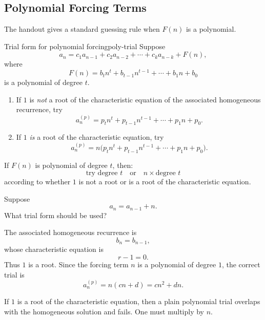 \subsection{Polynomial Forcing Terms}

The handout gives a standard guessing rule when \(F(n)\) is a polynomial.

\begin{theorem}{Trial form for polynomial forcing}{poly-trial}
Suppose
\[
a_n=c_1a_{n-1}+c_2a_{n-2}+\cdots+c_ka_{n-k}+F(n),
\]
where
\[
F(n)=b_tn^t+b_{t-1}n^{t-1}+\cdots+b_1n+b_0
\]
is a polynomial of degree \(t\).

\begin{enumerate}[leftmargin=*]
    \item If \(1\) is \emph{not} a root of the characteristic equation of the associated homogeneous recurrence, try
    \[
    a_n^{(p)}=p_tn^t+p_{t-1}n^{t-1}+\cdots+p_1n+p_0.
    \]
    \item If \(1\) \emph{is} a root of the characteristic equation, try
    \[
    a_n^{(p)}=n\bigl(p_tn^t+p_{t-1}n^{t-1}+\cdots+p_1n+p_0\bigr).
    \]
\end{enumerate}
\end{theorem}

\begin{keyformula}[title={Polynomial forcing rule}]
If \(F(n)\) is polynomial of degree \(t\), then:
\[
\text{try degree }t
\quad\text{or}\quad
n\times\text{degree }t
\]
according to whether \(1\) is not a root or is a root of the characteristic equation.
\end{keyformula}

\begin{examplebox}[title={Handout question: what should we try?}]
Suppose
\[
a_n=a_{n-1}+n.
\]
What trial form should be used?

The associated homogeneous recurrence is
\[
b_n=b_{n-1},
\]
whose characteristic equation is
\[
r-1=0.
\]
Thus \(1\) is a root. Since the forcing term \(n\) is a polynomial of degree \(1\), the correct trial is
\[
a_n^{(p)}=n(cn+d)=cn^2+dn.
\]
\end{examplebox}

\begin{commonmistake}[title={Forgetting the extra factor \(n\)}]
If \(1\) is a root of the characteristic equation, then a plain polynomial trial overlaps with the homogeneous solution and fails. One must multiply by \(n\).

\end{commonmistake}

